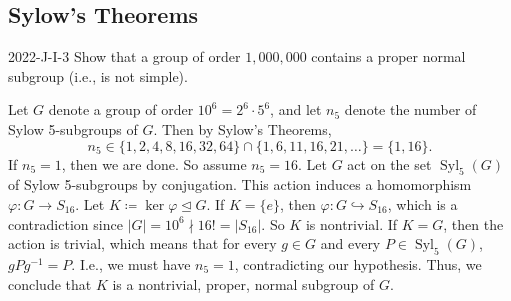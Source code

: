 \documentclass{article}
\newcommand{\embedd}{\hookrightarrow}
\begin{document}
	\subsection{Sylow's Theorems}

	
	\begin{prb}{2022-J-I-3}
		Show that a group of order $1,000,000$ contains a proper normal subgroup (i.e., is not simple). 
	\end{prb}
	Let $G$ denote a group of order $10^{6}= 2^{6} \cdot 5^{6}$, and let $n_{5}$ denote the number of Sylow 5-subgroups of $G$. Then by Sylow's Theorems, 
	\begin{equation*}
		n_{5} \in \{1, 2, 4, 8, 16, 32, 64\} \cap \{1, 6, 11, 16, 21, \ldots \} = \{1, 16\}. 
	\end{equation*}
	If $n_{5} = 1$, then we are done. So assume $n_{5} = 16$. Let $G$ act on the set $\operatorname{Syl}_{5}(G)$ of Sylow 5-subgroups by conjugation. This action induces a homomorphism $\varphi: G \to S_{16}$. Let $K \coloneqq \ker{\varphi} \trianglelefteq G$. If $K = \{e\}$, then $\varphi: G \embedd S_{16}$, which is a contradiction since $|G| = 10^{6} \nmid 16! = |S_{16}|$. So $K$ is nontrivial. If $K = G$, then the action is trivial, which means that for every $g \in G$ and every $P \in \operatorname{Syl}_{5}(G)$, $gPg^{-1} = P$. I.e., we must have $n_{5} = 1$, contradicting our hypothesis. Thus, we conclude that $K$ is a nontrivial, proper, normal subgroup of $G$. 
	
\end{document}
